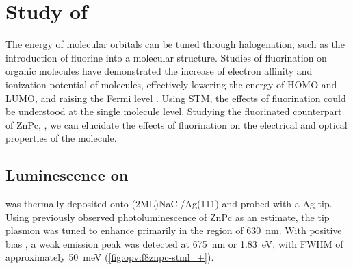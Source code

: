 






\section{Study of }

The energy of molecular orbitals can be tuned through halogenation, such as the introduction of fluorine into a molecular structure. Studies of fluorination on organic molecules have demonstrated the increase of electron affinity and ionization potential of molecules, effectively lowering the energy of HOMO and LUMO, and raising the Fermi level \citep{schwarze2016band,warren2019controlling}. Using \ac{STM}, the effects of fluorination could be understood at the single molecule level. Studying the fluorinated counterpart of ZnPc, , we can elucidate the effects of fluorination on the electrical and optical properties of the molecule.


\subsection{Luminescence on }

 was thermally deposited onto (2ML)NaCl/Ag(111) and probed with a Ag tip. Using previously observed photoluminescence of ZnPc as an estimate, the tip plasmon was tuned to enhance primarily in the region of \SI{630}{nm}. With positive bias , a weak emission peak was detected at \SI{675}{nm} or \SI{1.83}{eV}, with FWHM of approximately \SI{50}{meV} (\autoref{fig:opv:f8znpc-stml_+}).

